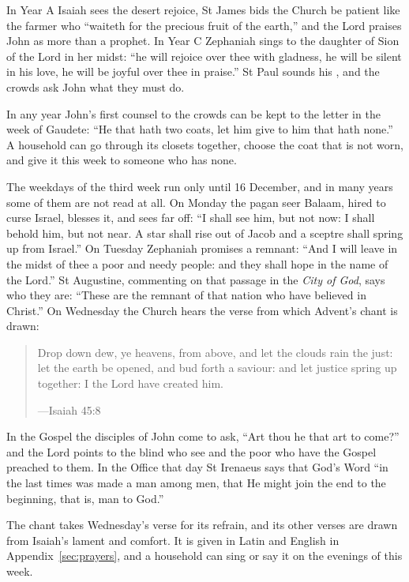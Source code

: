 In Year A Isaiah sees the desert rejoice, St James bids the Church be patient
like the farmer who ``waiteth for the precious fruit of the earth,'' and the
Lord praises John as more than a prophet. In Year C Zephaniah sings to the
daughter of Sion of the Lord in her midst: ``he will rejoice over thee with
gladness, he will be silent in his love, he will be joyful over thee in
praise.'' St Paul sounds his , and the crowds ask John what they
must do.

In any year John's first counsel to the crowds can be kept to the letter in the
week of Gaudete: ``He that hath two coats, let him give to him that hath none.''
A household can go through its closets together, choose the coat that is not
worn, and give it this week to someone who has none.

The weekdays of the third week run only until 16 December, and in many years
some of them are not read at all. On Monday the pagan seer Balaam, hired to
curse Israel, blesses it, and sees far off: ``I shall see him, but not now: I
shall behold him, but not near. A star shall rise out of Jacob and a sceptre
shall spring up from Israel.'' On Tuesday Zephaniah promises a remnant: ``And I
will leave in the midst of thee a poor and needy people: and they shall hope in
the name of the Lord.'' St Augustine, commenting on that passage in the
\emph{City of God}, says who they are: ``These are the remnant of that nation
who have believed in Christ.'' On Wednesday the Church hears the verse from
which Advent's chant  is drawn:

\begin{quote}
Drop down dew, ye heavens, from above, and let the clouds rain the just: let the
earth be opened, and bud forth a saviour: and let justice spring up together: I
the Lord have created him.\par
{\smallskip\noindent\small ---Isaiah 45:8\par}
\end{quote}

\noindent In the Gospel the disciples of John come to ask, ``Art thou he that art
to come?'' and the Lord points to the blind who see and the poor who have the
Gospel preached to them. In the Office that day St Irenaeus says that God's Word
``in the last times was made a man among men, that He might join the end to the
beginning, that is, man to God.''

The chant  takes Wednesday's verse for its
refrain, and its other verses are drawn from Isaiah's lament and comfort. It is
given in Latin and English in Appendix~\ref{sec:prayers}, and a household can
sing or say it on the evenings of this week.

